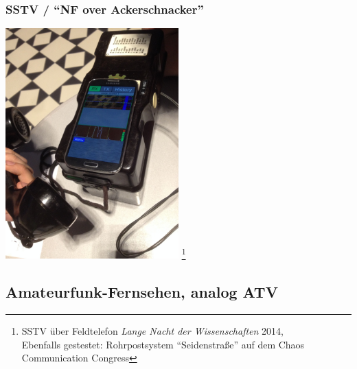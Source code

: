 \begin{frame}
    \frametitle{SSTV / ``NF over Ackerschnacker''}

    \begin{center}
        \includegraphics[width=0.5\textwidth,height=.8\textheight,keepaspectratio]{e16/SSTV-over-Ackerschnacker_LNDW2014.jpg}
        \footnote{SSTV über Feldtelefon \emph{Lange Nacht der Wissenschaften} 2014, \\
                  Ebenfalls gestestet: Rohrpostsystem ``Seidenstraße'' auf dem
                  Chaos Communication Congress}
    \end{center}

\end{frame}

%
%

\subsection[ATV]{Amateurfunk-Fernsehen, analog ATV}

